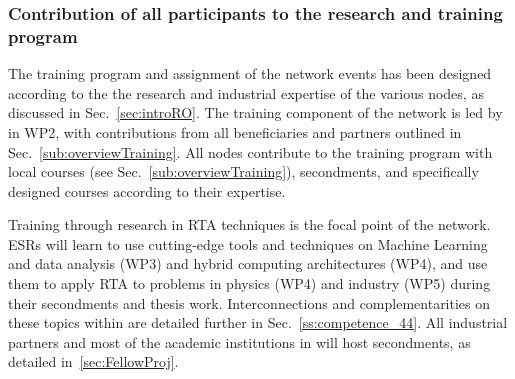 \subsubsection{Contribution of all participants to the research and training program}
\label{sec:trainingcontrib}


The training program and assignment of the network events has been designed according to the 
the research and industrial expertise of the various nodes, as discussed in Sec.~\ref{sec:introRO}.
The training component of the network is led by \unigeentity in WP2, with contributions
from all beneficiaries and partners outlined in Sec.~\ref{sub:overviewTraining}.  
All nodes contribute to the training program with local courses (see Sec.~\ref{sub:overviewTraining}), 
secondments, and specifically designed courses according to their expertise. 

Training through research in RTA techniques is the focal point of the network. 
ESRs will learn to use cutting-edge tools and techniques on Machine Learning and data analysis
(WP3) and hybrid computing architectures (WP4), and use them to apply RTA to
problems in physics (WP4) and industry (WP5) during their secondments and thesis work.
Interconnections and complementarities on these topics within \acronym
are detailed further in Sec.~\ref{ss:competence_44}. All industrial partners 
and most of the academic institutions in \acronym will host secondments, 
as detailed in~\ref{sec:FellowProj}. 
 
